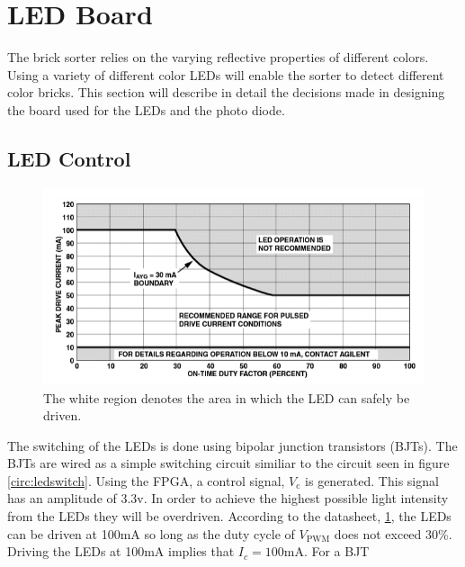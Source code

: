 \section{LED Board}
The brick sorter relies on the varying reflective properties of different colors. Using a variety of different color LEDs will enable the sorter to detect different color bricks. This section will describe in detail the decisions made in designing the board used for the LEDs and the photo diode. 

\subsection{LED Control}
\begin{figure}[h!]
	\begin{center}
		\includegraphics[width=\linewidth]{images/overdrive}
	\end{center}
	\caption{The white region denotes the area in which the LED can safely be driven.}
	\label{fig:overdrive}
\end{figure}
The switching of the LEDs is done using bipolar junction transistors (BJTs). The BJTs are wired as a simple switching circuit similiar to the circuit seen in figure \ref{circ:ledswitch}. 
Using the FPGA, a control signal, $V_{\text{c}}$ is generated. This signal has an amplitude of 3.3v. 
In order to achieve the highest possible light intensity from the LEDs they will be overdriven. According to the datasheet, \ref{fig:overdrive}, the LEDs can be driven at 100mA so long as the duty cycle of $V_{\text{PWM}}$ does not exceed 30\%. Driving the LEDs at 100mA implies that $I_c=100\text{mA}$. 
For a BJT

